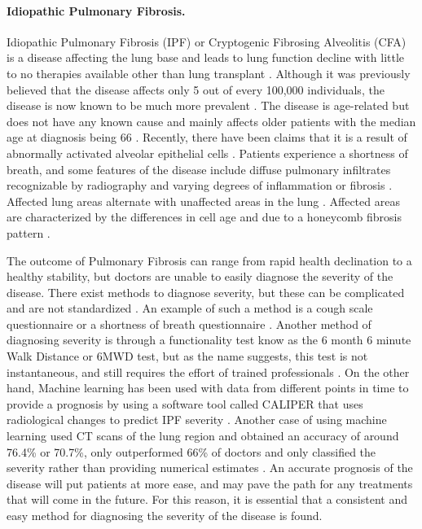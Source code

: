 \documentclass[12pt]{article}
\begin{document}
\paragraph*{Idiopathic Pulmonary Fibrosis.}

Idiopathic Pulmonary Fibrosis (IPF) or Cryptogenic Fibrosing Alveolitis (CFA) is a disease affecting the lung base and leads to lung function decline with little to no therapies available other than lung transplant \cite{mason1999pharmacological,gross2001idiopathic}. 
Although it was previously believed that the disease affects only 5 out of every 100,000 individuals, the disease is now known to be much more prevalent \cite{coultas1994epidemiology,mason1999pharmacological,raghu2018diagnosis}. 
The disease is age-related but does not have any known cause and mainly affects older patients with the median age at diagnosis being 66 \cite{king2011idiopathic,raghu2018diagnosis}. %
Recently, there have been claims that it is a result of abnormally activated alveolar epithelial cells \cite{king2011idiopathic}. %
Patients experience a shortness of breath, and some features of the disease include diffuse pulmonary infiltrates recognizable by radiography and varying degrees of inflammation or fibrosis \cite{gross2001idiopathic}. 
Affected lung areas alternate with unaffected areas in the lung \cite{gross2001idiopathic}.
Affected areas are characterized by the differences in cell age and due to a honeycomb fibrosis pattern \cite{gross2001idiopathic}.

The outcome of Pulmonary Fibrosis can range from rapid health declination to a healthy stability, but doctors are unable to easily diagnose the severity of the disease. 
There exist methods to diagnose severity, but these can be complicated and are not standardized \cite{robbie2017evaluating}. 
An example of such a method is a cough scale questionnaire or a shortness of breath questionnaire \cite{robbie2017evaluating,king2014phase,van2016cough}.
Another method of diagnosing severity is through a functionality test know as the 6 month 6 minute Walk Distance or 6MWD test, but as the name suggests, this test is not instantaneous, and still requires the effort of trained professionals \cite{robbie2017evaluating,du20146}.
On the other hand, Machine learning has been used with data from different points in time to provide a prognosis by using a software tool called CALIPER that uses radiological changes to predict IPF severity \cite{maldonado2014automated}.
Another case of using machine learning used CT scans of the lung region and obtained an accuracy of around 76.4\% or 70.7\%, only outperformed 66\% of doctors and only classified the severity rather than providing numerical estimates \cite{walsh2018deep}.
An accurate prognosis of the disease will put patients at more ease, and may pave the path for any treatments that will come in the future. 
For this reason, it is essential that a consistent and easy method for diagnosing the severity of the disease is found.
\end{document}
